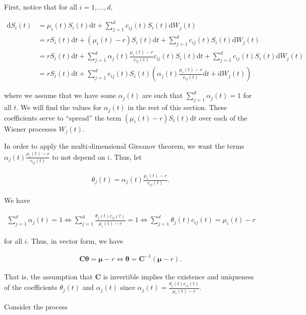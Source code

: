 \documentclass[a4paper]{article}
\begin{document}
First, notice that for all $i=1,\ldots,d$,

\begin{align*}
  \mathrm{d}S_i(t)
  &= \mu_i(t) S_i(t) \mathrm{d}t + \sum_{j=1}^{d} c_{ij}(t) S_i(t) \mathrm{d}W_j(t)\\
  &= r S_i(t) \mathrm{d}t + (\mu_i(t) - r) S_i(t) \mathrm{d}t + \sum_{j=1}^{d} c_{ij}(t) S_i(t) \mathrm{d}W_j(t)\\
  &= r S_i(t) \mathrm{d}t + \sum_{j=1}^{d} \alpha_j(t) \frac{\mu_i(t) - r}{c_{ij}(t)} c_{ij}(t) S_i(t) \mathrm{d}t + \sum_{j=1}^{d} c_{ij}(t) S_i(t) \mathrm{d}W_j(t)\\
  &= r S_i(t) \mathrm{d}t + \sum_{j=1}^{d} c_{ij}(t) S_i(t) \left(\alpha_j(t) \frac{\mu_i(t) - r}{c_{ij}(t)} \mathrm{d}t + \mathrm{d}W_j(t)\right)
\end{align*}

where we assume that we have some $\alpha_j(t)$ are such that $\sum_{j=1}^d \alpha_j(t) = 1$ for all $t$. We will find the values for $\alpha_j(t)$ in the rest of this section. These coefficients serve to ``spread'' the term $(\mu_i(t) - r) S_i(t) \mathrm{d}t$ over each of the Wiener processes $W_j(t)$.

In order to apply the multi-dimensional Girsanov theorem, we want the terms $\alpha_j(t) \frac{\mu_i(t) - r}{c_{ij}(t)}$ to not depend on $i$. Thus, let

\begin{align*}
  \theta_j(t) = \alpha_j(t) \frac{\mu_i(t) - r}{c_{ij}(t)}.
\end{align*}

We have

\begin{align*}
  \sum_{j=1}^{d} \alpha_j(t) = 1
  \iff \sum_{j=1}^{d} \frac{\theta_j(t) c_{ij}(t)}{\mu_i(t) - r} = 1
  \iff \sum_{j=1}^{d} \theta_j(t) c_{ij}(t) = \mu_i(t) - r
\end{align*}

for all $i$. Thus, in vector form, we have

\begin{align*}
  \mathbf{C} \mathbf{\theta} = \mathbf{\mu} - r
  \iff \mathbf{\theta} = \mathbf{C}^{-1} (\mathbf{\mu} - r).
\end{align*}

That is, the assumption that $\mathbf{C}$ is invertible implies the existence and uniqueness of the coefficients $\theta_j(t)$ and $\alpha_j(t)$ since $\alpha_j(t) = \frac{\theta_j(t) c_{ij}(t)}{\mu_i(t) - r}$.

Consider the process
\end{document}
